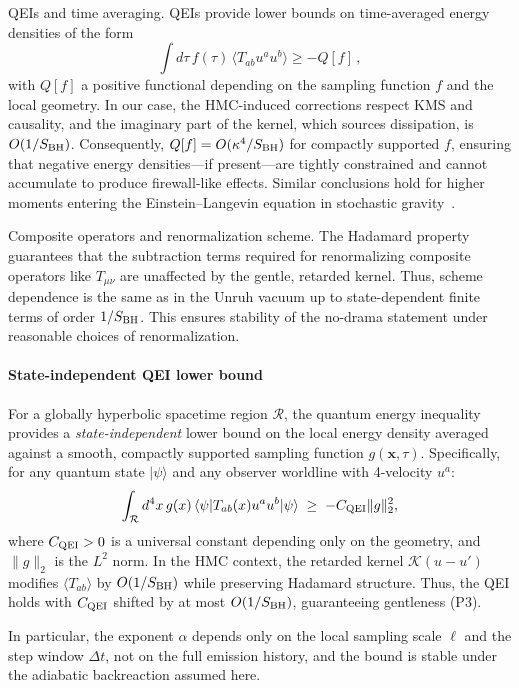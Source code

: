 \documentclass[a4paper,11pt]{article}
\newcommand{\HMC}{\textsc{HMC}\xspace}
\theoremstyle{plain}
\theoremstyle{definition}
\theoremstyle{remark}
\begin{document}
QEIs and time averaging. QEIs provide lower bounds on time-averaged energy densities of the form
\begin{equation}
\int d\tau\, f(\tau)\,\langle T_{ab}u^a u^b\rangle \ge - Q[f]\,,
\end{equation}
with $Q[f]$ a positive functional depending on the sampling function $f$ and the local geometry. In our case, the \HMC{}-induced corrections respect KMS and causality, and the imaginary part of the kernel, which sources dissipation, is $O(1/S_{\rm BH})$. Consequently, $Q[f]=O(\kappa^4/S_{\rm BH})$ for compactly supported $f$, ensuring that negative energy densities---if present---are tightly constrained and cannot accumulate to produce firewall-like effects. Similar conclusions hold for higher moments entering the Einstein--Langevin equation in stochastic gravity~\cite{HuVerdaguer:2008}.

Composite operators and renormalization scheme. The Hadamard property guarantees that the subtraction terms required for renormalizing composite operators like $T_{\mu\nu}$ are unaffected by the gentle, retarded kernel. Thus, scheme dependence is the same as in the Unruh vacuum up to state-dependent finite terms of order $1/S_{\rm BH}$. This ensures stability of the no-drama statement under reasonable choices of renormalization.

\paragraph{State-independent QEI lower bound}
For a globally hyperbolic spacetime region $\mathcal{R}$, the quantum energy inequality provides a \emph{state-independent} lower bound on the local energy density averaged against a smooth, compactly supported sampling function $g(\mathbf{x},\tau)$. Specifically, for any quantum state $|\psi\rangle$ and any observer worldline with 4-velocity $u^a$:
\begin{equation}
\int_{\mathcal{R}} d^4x\, g(x)\,\langle\psi| T_{ab}(x)u^a u^b|\psi\rangle \;\ge\; -C_{\rm QEI}\|g\|_2^2,
\end{equation}
where $C_{\rm QEI}>0$ is a universal constant depending only on the geometry, and $\|g\|_2$ is the $L^2$ norm. In the \HMC{} context, the retarded kernel $\mathcal{K}(u-u')$ modifies $\langle T_{ab}\rangle$ by $O(1/S_{\rm BH})$ while preserving Hadamard structure. Thus, the QEI holds with $C_{\rm QEI}$ shifted by at most $O(1/S_{\rm BH})$, guaranteeing gentleness (P3).

\noindent In particular, the exponent \(\alpha\) depends only on the local sampling scale \(\ell\) and the step window \(\Delta t\), not on the full emission history, and the bound is stable under the adiabatic backreaction assumed here.
\end{document}
